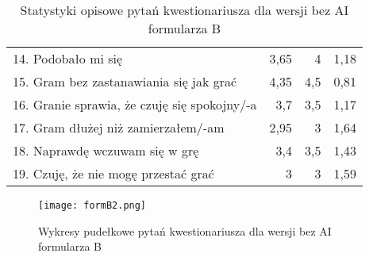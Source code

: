 \begin{table}[h!]
\begin{center}
\begin{tabular}{|m{10em}|r|r|r|}
            14. Podobało mi się                                               & 3,65          & 4       & 1,18           \\
            15. Gram bez zastanawiania się jak grać                           & 4,35          & 4,5     & 0,81           \\
            16. Granie sprawia, \newline że czuję się spokojny/-a             & 3,7           & 3,5     & 1,17           \\
            17. Gram dłużej \newline niż zamierzałem/-am                      & 2,95          & 3       & 1,64           \\
            18. Naprawdę wczuwam się w grę                                    & 3,4           & 3,5     & 1,43           \\
            19. Czuję, że nie mogę przestać grać                              & 3             & 3       & 1,59           \\
            \hline
        \end{tabular}
    \end{center}
    \caption{Statystyki opisowe pytań kwestionariusza dla wersji bez AI formularza B}\label{tab1:appendixB_9}
\end{table}

\begin{figure}[h!]
    \centering
    \texttt{[image: formB2.png]}
    \caption{Wykresy pudełkowe pytań kwestionariusza dla wersji bez AI formularza B}
    \label{fig:ch7_formB2}
\end{figure}